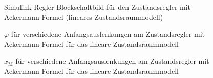 \documentclass[
	pagesize,
	fontsize=12pt,
	paper=a4,
	oneside,
   reqno
]{scrartcl}
\begin{document}
\begin{figure}[H]
    \centering
    \caption[Ackermann Regler Simulink (linear)]{Simulink Regler-Blockschaltbild für den Zustandsregler mit Ackermann-Formel (lineares Zustandsraummodell)}
    \label{fig:Bild11.5}
\end{figure}

\begin{figure}[H]
    \centering
    \caption[$\varphi$ für Regler mit Ackermann-Formel (linear)]{$\varphi$ für verschiedene Anfangsauslenkungen am Zustandsregler mit Ackermann-Formel für das lineare Zustandsraummodell}
    \label{fig:Bild12.5}
\end{figure}

\begin{figure}[H]
    \centering
    \caption[$x_{\mathrm{M}}$ für Regler mit Ackermann-Formel (linear)]{$x_{\mathrm{M}}$ für verschiedene Anfangsauslenkungen am Zustandsregler mit Ackermann-Formel für das lineare Zustandsraummodell}
    \label{fig:Bild13}
\end{figure}
\end{document}
